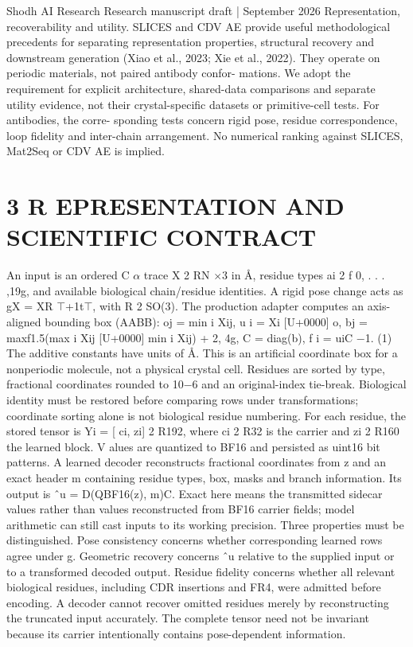 \documentclass[11pt]{article}
\begin{document}
Shodh AI Research Research manuscript draft | September 2026
Representation, recoverability and utility. SLICES and CDV AE provide useful methodological
precedents for separating representation properties, structural recovery and downstream generation
(Xiao et al., 2023; Xie et al., 2022). They operate on periodic materials, not paired antibody confor-
mations. We adopt the requirement for explicit architecture, shared-data comparisons and separate
utility evidence, not their crystal-specific datasets or primitive-cell tests. For antibodies, the corre-
sponding tests concern rigid pose, residue correspondence, loop fidelity and inter-chain arrangement.
No numerical ranking against SLICES, Mat2Seq or CDV AE is implied.

\section*{3 R EPRESENTATION AND SCIENTIFIC CONTRACT}

An input is an ordered C \ensuremath{\alpha} trace X 2 RN \ensuremath{\times}3 in Å, residue types ai 2 f 0, . . . ,19g, and available
biological chain/residue identities. A rigid pose change acts as gX = XR \ensuremath{\top}+1t\ensuremath{\top}, with R 2 SO(3).
The production adapter computes an axis-aligned bounding box (AABB):
oj = min
i
Xij, u i = Xi [U+0000] o,
bj = maxf1.5(max
i
Xij [U+0000] min
i
Xij) + 2, 4g,
C = diag(b), f i = uiC \ensuremath{-}1.
(1)
The additive constants have units of Å. This is an artificial coordinate box for a nonperiodic
molecule, not a physical crystal cell. Residues are sorted by type, fractional coordinates rounded to
10\ensuremath{-}6 and an original-index tie-break. Biological identity must be restored before comparing rows
under transformations; coordinate sorting alone is not biological residue numbering.
For each residue, the stored tensor is Yi = [ ci, zi] 2 R192, where ci 2 R32 is the carrier and
zi 2 R160 the learned block. V alues are quantized to BF16 and persisted as uint16 bit patterns.
A learned decoder reconstructs fractional coordinates from z and an exact header m containing
residue types, box, masks and branch information. Its output is ˆu = D(QBF16(z), m)C. Exact
here means the transmitted sidecar values rather than values reconstructed from BF16 carrier fields;
model arithmetic can still cast inputs to its working precision.
Three properties must be distinguished. Pose consistency concerns whether corresponding learned
rows agree under g. Geometric recovery concerns ˆu relative to the supplied input or to a transformed
decoded output. Residue fidelity concerns whether all relevant biological residues, including CDR
insertions and FR4, were admitted before encoding. A decoder cannot recover omitted residues
merely by reconstructing the truncated input accurately. The complete tensor need not be invariant
because its carrier intentionally contains pose-dependent information.
\end{document}
